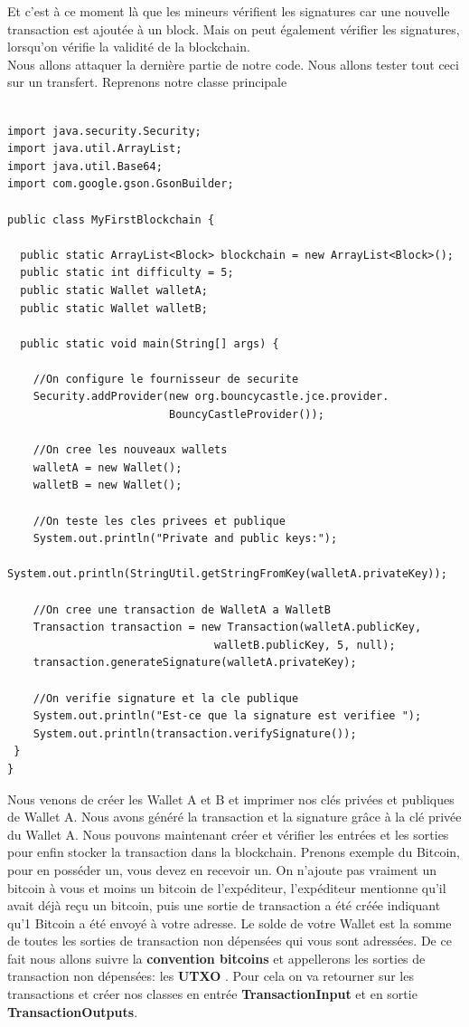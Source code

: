 \documentclass[12pt]{report}
\begin{document}
\hspace{1cm} Et c'est à ce moment là que les mineurs vérifient les signatures car une nouvelle transaction est ajoutée à un block. Mais on peut également vérifier les signatures, lorsqu'on vérifie la validité de la blockchain.\\
Nous allons attaquer la dernière partie de notre code. Nous allons tester tout ceci sur un transfert. Reprenons notre classe principale

\begin{lstlisting}

import java.security.Security;
import java.util.ArrayList;
import java.util.Base64;
import com.google.gson.GsonBuilder;

public class MyFirstBlockchain {
	
  public static ArrayList<Block> blockchain = new ArrayList<Block>();
  public static int difficulty = 5;
  public static Wallet walletA;
  public static Wallet walletB;

  public static void main(String[] args) {
  
    //On configure le fournisseur de securite
    Security.addProvider(new org.bouncycastle.jce.provider.
                         BouncyCastleProvider()); 
    
    //On cree les nouveaux wallets
    walletA = new Wallet();
    walletB = new Wallet();
    
    //On teste les cles privees et publique
    System.out.println("Private and public keys:");
    System.out.println(StringUtil.getStringFromKey(walletA.privateKey));
    
    //On cree une transaction de WalletA a WalletB
    Transaction transaction = new Transaction(walletA.publicKey, 
                                walletB.publicKey, 5, null);
    transaction.generateSignature(walletA.privateKey);
    
    //On verifie signature et la cle publique
    System.out.println("Est-ce que la signature est verifiee ");
    System.out.println(transaction.verifySignature());
 }
}

\end{lstlisting}

\hspace{1cm} Nous venons de créer les Wallet A et B et imprimer nos clés  privées et publiques de Wallet A. Nous avons généré la transaction et la signature grâce à la clé privée du Wallet A. Nous pouvons maintenant créer et vérifier les entrées et les sorties pour enfin stocker la transaction dans la blockchain. Prenons exemple du Bitcoin, pour en posséder un, vous devez en recevoir un. On n'ajoute pas vraiment un bitcoin à vous et moins un bitcoin de l'expéditeur, l'expéditeur mentionne qu'il avait déjà reçu un bitcoin, puis une sortie de transaction a été créée indiquant qu'1 Bitcoin a été envoyé à votre adresse. Le solde de votre Wallet est la somme de toutes les sorties de transaction non dépensées qui vous sont adressées. De ce fait nous allons suivre la \textbf{convention bitcoins} et appellerons les sorties de transaction non dépensées: les \textbf{UTXO} . Pour cela on va retourner sur les transactions et créer nos classes en entrée \textbf{TransactionInput} et en sortie \textbf{TransactionOutputs}. 
\end{document}
